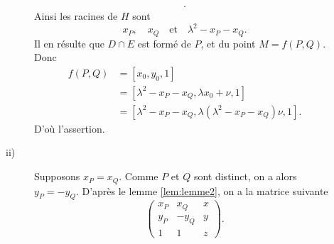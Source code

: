 \begin{demonstration}
\begin{description}
\begin{description}
\begin{align*}
           .\end{align*} 
           Ainsi les racines de $H$ sont
           \[
           x_P, \quad x_Q \quad \text{et} \quad \lambda^2 - x_P - x_Q
           .\] 
           Il en résulte que $D \cap E$ est formé de $P$, et du point $M = f(P,Q)$.
           Donc  
           \begin{align*}
               f(P,Q) &= \left[ x_0, y_0, 1 \right] \\
                      &= \left[ \lambda^2 - x_P - x_Q, \lambda x_0 + \nu, 1 \right] \\
                      &= \left[ \lambda^2 - x_P - x_Q, \lambda\left( \lambda^2 - x_P - x_Q
                      \right) \nu, 1\right]
           .\end{align*}
           D'où l'assertion.
       \item[ii)] Supposons $x_P = x_Q$. Comme $P$ et $Q$ sont distinct, on a alors $y_P = - y_Q$.
               D'après le lemme \ref{lem:lemme2}, on a la matrice suivante
               \[
                   \begin{pmatrix} x_P & x_Q & x \\
                   y_P & - y_Q & y \\
               1 & 1 & z
           \end{pmatrix} 
               .\] 


\end{description}
\end{description}
\end{demonstration}
